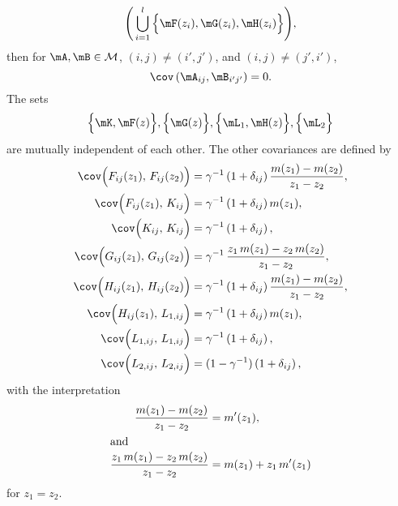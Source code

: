 \begin{lemma}
\[        \Bigg(
        \bigcup_{i=1}^l
            \Big\{ 
                \mF(z_i), \mG(z_i), \mH(z_i)
            \Big\}
        \Bigg),
    \] 
    then for $\mA, \mB \in \mathcal{M}$, $(i,j) \neq (i',j')$, and 
    $(i,j) \neq (j',i')$,
    \[
        \cov\left( \mA_{ij}, \mB_{i'j'} \right)
        =
        0.
    \]
    The sets
    \[
        \Big\{ \mK, \mF( z ) \Big\},
        \Big\{ \mG( z) \Big\},
        \Big\{ \mL_1, \mH( z )\Big\},
        \Big\{ \mL_2 \Big\}
    \]
    are mutually independent of each other.
    The other covariances are defined by
    \begin{align*}
        \cov\Big( F_{ij}(z_1), \, F_{ij}(z_2) \Big)
            &= \gamma^{-1}
               \left( 1 + \delta_{ij} \right)
               \frac{ m(z_1) - m(z_2) }
                    { z_1 - z_2 }, \\
        \cov\Big( F_{ij}(z_1), \, K_{ij} \Big)
            &= \gamma^{-1}
               \left( 1 + \delta_{ij} \right) m(z_1), \\
        \cov\Big( K_{ij}, \, K_{ij} \Big)
            &= \gamma^{-1}
               \left( 1 + \delta_{ij} \right), \\
        \cov\Big( G_{ij}(z_1), \, G_{ij}(z_2) \Big)
            &= \gamma^{-1} \,
               \frac{ z_1 \, m(z_1) - z_2 \, m(z_2) }
                    { z_1 - z_2 }, \\
        \cov\Big( H_{ij}(z_1), \, H_{ij}(z_2) \Big)
            &= \gamma^{-1}
               \left( 1 + \delta_{ij} \right)
               \frac{ m(z_1) - m(z_2) }
                    { z_1 - z_2 }, \\
        \cov\Big( H_{ij}(z_1), \, L_{1,ij} \Big)
            &= \gamma^{-1}
               \left( 1 + \delta_{ij} \right) m(z_1), \\
        \cov\Big( L_{1,ij}, \, L_{1,ij} \Big)
            &= \gamma^{-1}
               \left( 1 + \delta_{ij} \right), \\
        \cov\Big( L_{2,ij}, \, L_{2,ij} \Big)
            &= (1 - \gamma^{-1})
               \left( 1 + \delta_{ij} \right),
    \end{align*}
    with the interpretation
    \begin{align*}
        \frac{ m(z_1) - m(z_2) }
             { z_1 - z_2 }
            &=
                m'(z_1), \\
    \intertext{and}
        \frac{ z_1 \, m(z_1) - z_2 \, m(z_2) }
             { z_1 - z_2 }
            &= m( z_1 ) + z_1 \, m'(z_1)
    \end{align*}
    for $z_1 = z_2$.
\end{lemma}
